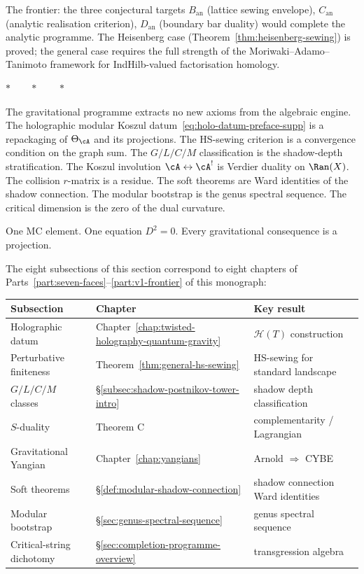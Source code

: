 The frontier: the three conjectural targets $B_{\mathrm{an}}$
(lattice sewing envelope), $C_{\mathrm{an}}$ (analytic
realisation criterion), $D_{\mathrm{an}}$ (boundary bar duality)
would complete the analytic programme. The Heisenberg case
(Theorem~\ref{thm:heisenberg-sewing}) is proved; the general
case requires the full strength of the Moriwaki--Adamo--Tanimoto
framework for IndHilb-valued factorisation homology.

\bigskip
\begin{center}
$*\qquad*\qquad*$
\end{center}
\bigskip

\noindent
The gravitational programme extracts no new axioms from the
algebraic engine. The holographic modular Koszul
datum~\eqref{eq:holo-datum-preface-supp} is a repackaging of
$\Theta_\cA$ and its projections. The HS-sewing criterion is a
convergence condition on the graph sum. The $G/L/C/M$
classification is the shadow-depth stratification. The Koszul
involution $\cA\leftrightarrow\cA^!$ is Verdier duality on
$\Ran(X)$. The collision $r$-matrix is a residue. The soft
theorems are Ward identities of the shadow connection. The
modular bootstrap is the genus spectral sequence. The critical
dimension is the zero of the dual curvature.

One MC element. One equation $D^2=0$. Every gravitational
consequence is a projection.

\bigskip

The eight subsections of this section correspond to eight
chapters of Parts~\ref{part:seven-faces}--\ref{part:v1-frontier} of this monograph:

\begin{center}
\small
\renewcommand{\arraystretch}{1.15}
\begin{tabular}{lll}
\textbf{Subsection} & \textbf{Chapter} & \textbf{Key result} \\
\hline
Holographic datum
 & Chapter~\ref{chap:twisted-holography-quantum-gravity}
 & $\mathcal H(T)$ construction \\[2pt]
Perturbative finiteness
 & Theorem~\ref{thm:general-hs-sewing}
 & HS-sewing for standard landscape \\[2pt]
$G/L/C/M$ classes
 & \S\ref{subsec:shadow-postnikov-tower-intro}
 & shadow depth classification \\[2pt]
$S$-duality
 & Theorem C
 & complementarity / Lagrangian \\[2pt]
Gravitational Yangian
 & Chapter~\ref{chap:yangians}
 & Arnold $\Rightarrow$ CYBE \\[2pt]
Soft theorems
 & \S\ref{def:modular-shadow-connection}
 & shadow connection Ward identities \\[2pt]
Modular bootstrap
 & \S\ref{sec:genus-spectral-sequence}
 & genus spectral sequence \\[2pt]
Critical-string dichotomy
 & \S\ref{sec:completion-programme-overview}
 & transgression algebra
\end{tabular}
\end{center}

